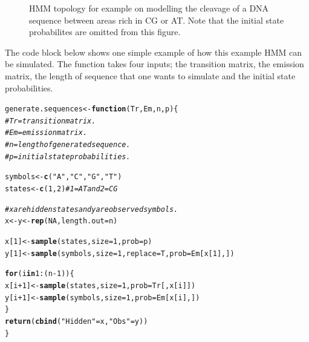 \documentclass{article}\usepackage[]{graphicx}\usepackage[]{color}
\makeatletter
\newcommand{\hlnum}[1]{\textcolor[rgb]{0.686,0.059,0.569}{#1}}%
\newcommand{\hlstr}[1]{\textcolor[rgb]{0.192,0.494,0.8}{#1}}%
\newcommand{\hlcom}[1]{\textcolor[rgb]{0.678,0.584,0.686}{\textit{#1}}}%
\newcommand{\hlopt}[1]{\textcolor[rgb]{0,0,0}{#1}}%
\newcommand{\hlstd}[1]{\textcolor[rgb]{0.345,0.345,0.345}{#1}}%
\newcommand{\hlkwa}[1]{\textcolor[rgb]{0.161,0.373,0.58}{\textbf{#1}}}%
\newcommand{\hlkwb}[1]{\textcolor[rgb]{0.69,0.353,0.396}{#1}}%
\newcommand{\hlkwc}[1]{\textcolor[rgb]{0.333,0.667,0.333}{#1}}%
\newcommand{\hlkwd}[1]{\textcolor[rgb]{0.737,0.353,0.396}{\textbf{#1}}}%
\newenvironment{kframe}{%
 \def\at@end@of@kframe{}%
 \ifinner\ifhmode%
  \def\at@end@of@kframe{\end{minipage}}%
  \begin{minipage}{\columnwidth}%
 \fi\fi%
 \def\FrameCommand##1{\hskip\@totalleftmargin \hskip-\fboxsep
 \colorbox{shadecolor}{##1}\hskip-\fboxsep
     \hskip-\linewidth \hskip-\@totalleftmargin \hskip\columnwidth}%
 \MakeFramed {\advance\hsize-\width
   \@totalleftmargin\z@ \linewidth\hsize
   \@setminipage}}%
 {\par\unskip\endMakeFramed%
 \at@end@of@kframe}
\newenvironment{knitrout}{}{} %
\makeatother
\begin{document}
\begin{figure}[htbp]
\begin{center}
    \end{center}
    \caption{HMM topology for example on modelling the cleavage of a DNA sequence between areas rich in CG or AT. Note that the initial state probabilites are omitted from this figure. }
    \label{fig:toy_hmm}
\end{figure}


The code block below shows one simple example of how this example HMM can be simulated. The function takes four inputs; the transition matrix, the emission matrix, the length of sequence that one wants to simulate and the initial state probabilities. 

\begin{knitrout}
\color{fgcolor}\begin{kframe}
\begin{alltt}
\hlstd{generate.sequences} \hlkwb{<-} \hlkwa{function}\hlstd{(}\hlkwc{Tr}\hlstd{,} \hlkwc{Em}\hlstd{,} \hlkwc{n}\hlstd{,} \hlkwc{p}\hlstd{)\{}
    \hlcom{# Tr = transition matrix.}
    \hlcom{# Em = emission matrix.}
    \hlcom{# n = length of generated sequence.}
    \hlcom{# p = initial state probabilities. }

  \hlstd{symbols} \hlkwb{<-} \hlkwd{c}\hlstd{(}\hlstr{"A"}\hlstd{,} \hlstr{"C"}\hlstd{,} \hlstr{"G"}\hlstd{,} \hlstr{"T"}\hlstd{)}
  \hlstd{states} \hlkwb{<-} \hlkwd{c}\hlstd{(}\hlnum{1}\hlstd{,} \hlnum{2}\hlstd{)} \hlcom{# 1 = AT and 2 = CG}

  \hlcom{# x are hidden states and y are observed symbols. }
  \hlstd{x} \hlkwb{<-} \hlstd{y} \hlkwb{<-} \hlkwd{rep}\hlstd{(}\hlnum{NA}\hlstd{,} \hlkwc{length.out} \hlstd{= n)}

  \hlstd{x[}\hlnum{1}\hlstd{]} \hlkwb{<-} \hlkwd{sample}\hlstd{(states,} \hlkwc{size} \hlstd{=} \hlnum{1}\hlstd{,} \hlkwc{prob} \hlstd{= p)}
  \hlstd{y[}\hlnum{1}\hlstd{]} \hlkwb{<-} \hlkwd{sample}\hlstd{(symbols,} \hlkwc{size} \hlstd{=} \hlnum{1}\hlstd{,}\hlkwc{replace}\hlstd{=T,}\hlkwc{prob} \hlstd{= Em[x[}\hlnum{1}\hlstd{],])}

  \hlkwa{for}\hlstd{(i} \hlkwa{in} \hlnum{1}\hlopt{:}\hlstd{(n}\hlopt{-}\hlnum{1}\hlstd{))\{}
    \hlstd{x[i}\hlopt{+}\hlnum{1}\hlstd{]} \hlkwb{<-} \hlkwd{sample}\hlstd{(states,} \hlkwc{size} \hlstd{=} \hlnum{1}\hlstd{,} \hlkwc{prob} \hlstd{= Tr[,x[i]])}
    \hlstd{y[i}\hlopt{+}\hlnum{1}\hlstd{]} \hlkwb{<-} \hlkwd{sample}\hlstd{(symbols,} \hlkwc{size} \hlstd{=} \hlnum{1}\hlstd{,} \hlkwc{prob} \hlstd{= Em[x[i], ])}
  \hlstd{\}}
  \hlkwd{return}\hlstd{(}\hlkwd{cbind}\hlstd{(}\hlstr{"Hidden"} \hlstd{= x,} \hlstr{"Obs"} \hlstd{= y))}
\hlstd{\}}
\end{alltt}
\end{kframe}
\end{knitrout}
\end{document}
